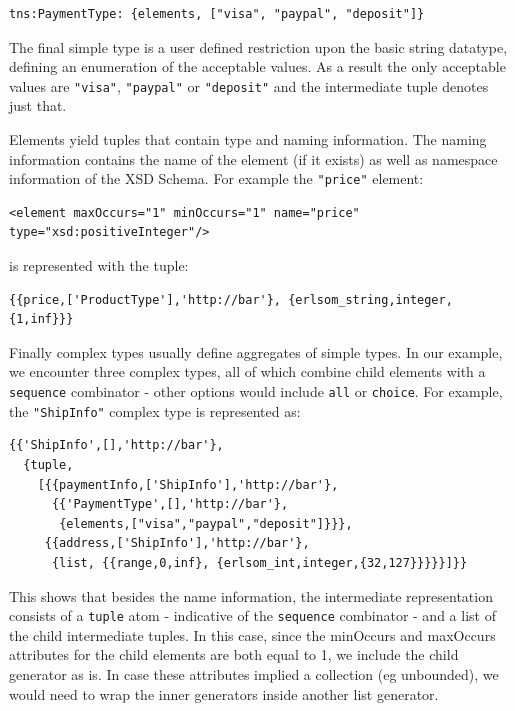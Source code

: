 \documentclass[submission,copyright,a4]{eptcs}
\begin{document}
\begin{lstlisting}
tns:PaymentType: {elements, ["visa", "paypal", "deposit"]}
\end{lstlisting}

The final simple type is a user defined restriction upon the basic
string datatype, defining an enumeration of the acceptable values. As
a result the only acceptable values are \texttt{"visa"},
\texttt{"paypal"} or \texttt{"deposit"} and the intermediate tuple
denotes just that.

Elements yield tuples that contain type and naming information. The
naming information contains the name of the element (if it exists) as
well as namespace information of the XSD Schema. For example the
\texttt{"price"} element:
\begin{lstlisting}
<element maxOccurs="1" minOccurs="1" name="price" type="xsd:positiveInteger"/>
\end{lstlisting}
is represented with the tuple:
\begin{lstlisting}
{{price,['ProductType'],'http://bar'}, {erlsom_string,integer,{1,inf}}}
\end{lstlisting}

Finally complex types usually define aggregates of simple types. In
our example, we encounter three complex types, all of which combine
child elements with a \texttt{sequence} combinator - other options
would include \texttt{all} or \texttt{choice}. For example, the
\texttt{"ShipInfo"} complex type is represented as:

\begin{lstlisting}
{{'ShipInfo',[],'http://bar'},
  {tuple,
    [{{paymentInfo,['ShipInfo'],'http://bar'},
      {{'PaymentType',[],'http://bar'},
       {elements,["visa","paypal","deposit"]}}},
     {{address,['ShipInfo'],'http://bar'},
      {list, {{range,0,inf}, {erlsom_int,integer,{32,127}}}}}]}}
\end{lstlisting}

This shows that besides the name information, the intermediate representation consists of a 
\texttt{tuple} atom - indicative of the \texttt{sequence} combinator - and a list of the 
child intermediate tuples. In this case, since the minOccurs and maxOccurs attributes for 
the child elements are both equal to 1, we include the child generator as is. In case these
attributes implied a collection (eg unbounded), we would need to wrap the inner generators 
inside another list generator.

\end{document}
